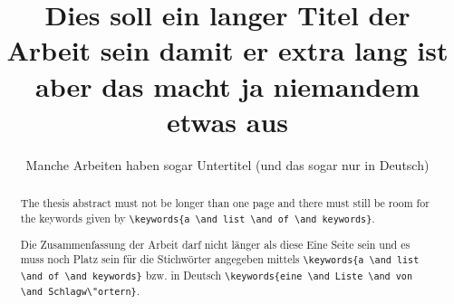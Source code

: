 \documentclass[%
    english,%
    online,%
    a4paper,%
    phd,%
]{isw}
\begin{document}
    \frontmatter
    
    \maketitle
    
    \begin{otherlanguage}{ngerman}
        \title{Dies soll ein langer Titel der Arbeit sein damit er extra lang ist aber das macht ja niemandem etwas aus}
        \subtitle{Manche Arbeiten haben sogar Untertitel (und das sogar nur in Deutsch)}
        
        \maketitle
    \end{otherlanguage}
%    
    
    \DeclarationOfAuthorship
    
    \begin{abstract}
        The thesis abstract must not be longer than one page and there must still be room for the keywords given by \lstinline!\keywords{a \and list \and of \and keywords}!.
        
        \lipsum[1-3]
    \end{abstract}
    
    \begin{otherlanguage}{ngerman}
        \begin{abstract}
            Die Zusammenfassung der Arbeit darf nicht l\"anger als diese Eine Seite sein und es muss noch Platz sein f\"ur die Stichw\"orter angegeben mittels \lstinline!\keywords{a \and list \and of \and keywords}! bzw. in Deutsch \lstinline!\keywords{eine \and Liste \and von \and Schlagw\"ortern}!.
            
            \lipsum[4-6]
            
        \end{abstract}
    \end{otherlanguage}
    
\end{document}
